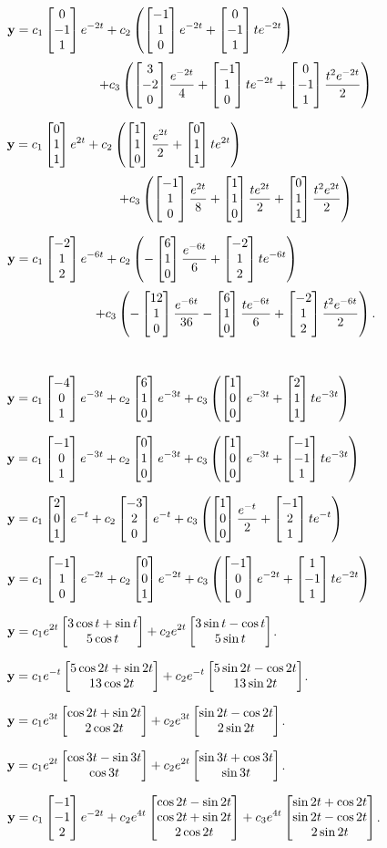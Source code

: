 \smallskip
{}
$\vect{y}=\dst{c_1\threecol0{-1}1e^{-2t}+
c_2\left(\threecol{{-1}}10e^{-2t}+\threecol0{-1}1te^{-2t}\right)}$
\[+c_3\left(\threecol3{-2}0\frac{e^{-2t}}{4}+\threecol{-1}10t
e^{-2t}+\threecol0{-1}1\frac{t^2e^{-2t}}{2}\right)\]

\smallskip
{}
 $\vect{y}=\dst{c_1\threecol011e^{2t}+
c_2\left(\threecol110\frac{e^{2t}}{2}+\threecol011te^{2t}\right)}$
\[+c_3\left(\threecol{-1}10\frac{e^{2t}}{8}+\threecol110\frac{t
e^{2t}}{2}+\threecol011\frac{t^2e^{2t}}{2}\right)\]

\smallskip
{}
 $\vect{y}=\dst{c_1\threecol{-2}12e^{-6t}+
c_2\left(-\threecol610\frac{e^{-6t}}{6}+\threecol{-2}12te^{-6t}\right)}$
\[+c_3\left(-\threecol{12}10\frac{e^{-6t}}{36}-\threecol610\frac{t
e^{-6t}}{6}+\threecol{-2}12\frac{t^2e^{-6t}}{2}\right).\]\

\smallskip
{}
 $\vect{y}=\dst{c_1\threecol{-4}01e^{-3t}+c_2\threecol610e^{-3t}+
c_3\left(\threecol100e^{-3t}+\threecol211te^{-3t}\right)}$

\smallskip

$\vect{y}=\dst{c_1\threecol{-1}01e^{-3t}+c_2\threecol010e^{-3t}+c_3\left
(\threecol100e^{-3t}+\threecol{-1}{-1}1te^{-3t}\right)}$

\smallskip

 $\vect{y}=\dst{
c_1\threecol201e^{-t}+c_2\threecol{-3}20e^{-t}+c_3\left
(\threecol100\frac{e^{-t}}{2}+\threecol{-1}21te^{-t}\right)}$

\smallskip
{}
 $\vect{y}=\dst{
c_1\threecol{-1}10e^{-2t}+c_2\threecol001e^{-2t}+c_3\left
(\threecol{-1}00e^{-2t}+\threecol1{-1}1te^{-2t}\right)}$



 $\vect{y}=\dst{c_1e^{2t}\ctwocol{3\cos t+\sin t}{5\cos t}
+c_2e^{2t}\ctwocol{3\sin t-\cos t}{5\sin t}}$.

\smallskip
{}
 $\vect{y}=\dst{c_1e^{-t}\ctwocol{5\cos2t+\sin2t}{13\cos2t}
+c_2e^{-t}\ctwocol{5\sin2t-\cos2t}{13\sin2t}}$.

\smallskip
{}
 $\vect{y}=\dst{c_1e^{3t}\ctwocol{\cos2t+\sin2t}{2\cos2t}
+c_2e^{3t}\ctwocol{\sin2t-\cos2t}{2\sin2t}}$.

\smallskip
{}
 $\vect{y}=\dst{c_1e^{2t}\ctwocol{\cos3t-\sin3t}{\cos3t}
+c_2e^{2t}\ctwocol{\sin3t+\cos3t}{\sin3t}}$.

\smallskip
{}
$\dst{\vect{y}=c_1\threecol{-1}{-1}2e^{-2t}+c_2e^{4t}\cthreecol{\cos2t-\sin
2t}{\cos2t+\sin  2t}{2\cos2t}+c_3e^{4t}\cthreecol
{\sin2t+\cos2t}{\sin2t-\cos2t}{2\sin2t}}$.

